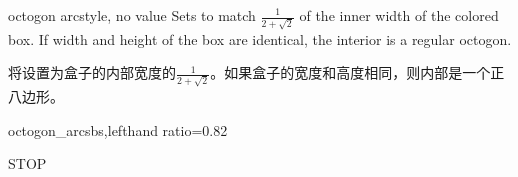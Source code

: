   \begin{docTcbKey}[][doc new=2015-05-05]{octogon arc}{}{style, no value}
  Sets  to match $\frac{1}{2+\sqrt{2}}$ of the inner width
  of the colored box. If width and height of the box are identical,
  the interior is a regular octogon.

将设置为盒子的内部宽度的$\frac{1}{2+\sqrt{2}}$。如果盒子的宽度和高度相同，则内部是一个正八边形。

\begin{exdispExample*}{octogon_arc}{sbs,lefthand ratio=0.82}
\begin{tcolorbox}[enhanced,%
size=minimal,%
auto outer arc,%
width=2.1cm,
octogon arc,%
colback=red,%
colframe=white,%
colupper=white,%
fontupper=\fontsize{7mm}{7mm}\selectfont\bfseries\sffamily,
halign=center,%
valign=center,%
square,%
arc is angular,%
borderline={0.2mm}{-1mm}{red}
]
STOP
\end{tcolorbox}
\end{exdispExample*}
\end{docTcbKey}



